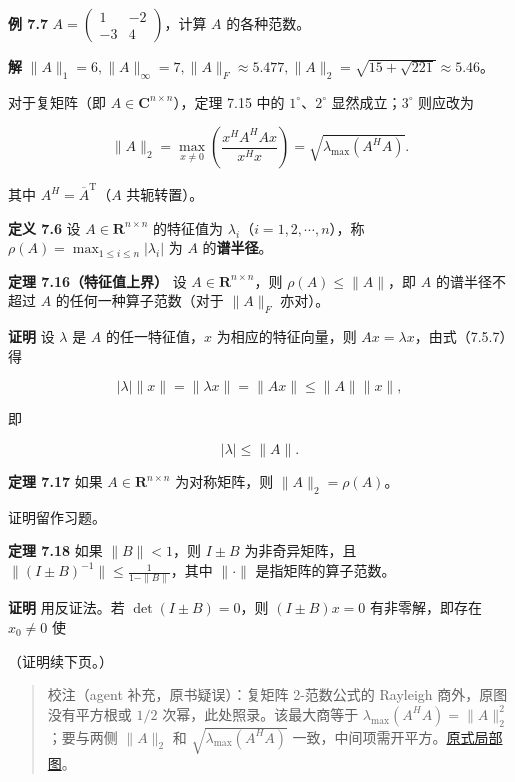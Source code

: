 \documentclass[
  10pt,
  fontset=fandol]{ctexart}
\begin{document}
\textbf{例 7.7} \(A=\begin{pmatrix}1&-2\\-3&4\end{pmatrix}\)，计算 \(A\) 的各种范数。

\textbf{解} \(\|A\|_1=6,\|A\|_\infty=7,\|A\|_F\approx5.477,\|A\|_2=\sqrt{15+\sqrt{221}}\approx5.46\)。

对于复矩阵（即 \(A\in\mathbf C^{n\times n}\)），定理 7.15 中的 \(1^\circ\)、\(2^\circ\) 显然成立；\(3^\circ\) 则应改为

\[
\|A\|_2=\max_{x\neq0}\left(\frac{x^HA^HAx}{x^Hx}\right)=\sqrt{\lambda_{\max}(A^HA)}.
\]

其中 \(A^H=\overline A^{\mathrm T}\)（\(A\) 共轭转置）。

\textbf{定义 7.6} 设 \(A\in\mathbf R^{n\times n}\) 的特征值为 \(\lambda_i\)（\(i=1,2,\cdots,n\)），称 \(\rho(A)=\max_{1\leqslant i\leqslant n}|\lambda_i|\) 为 \(A\) 的\textbf{谱半径}。

\textbf{定理 7.16（特征值上界）} 设 \(A\in\mathbf R^{n\times n}\)，则 \(\rho(A)\leqslant\|A\|\)，即 \(A\) 的谱半径不超过 \(A\) 的任何一种算子范数（对于 \(\|A\|_F\) 亦对）。

\textbf{证明} 设 \(\lambda\) 是 \(A\) 的任一特征值，\(x\) 为相应的特征向量，则 \(Ax=\lambda x\)，由式（7.5.7）得

\[
|\lambda|\|x\|=\|\lambda x\|=\|Ax\|\leqslant\|A\|\|x\|,
\]

即

\[
|\lambda|\leqslant\|A\|.
\]

\textbf{定理 7.17} 如果 \(A\in\mathbf R^{n\times n}\) 为对称矩阵，则 \(\|A\|_2=\rho(A)\)。

证明留作习题。

\textbf{定理 7.18} 如果 \(\|B\|<1\)，则 \(I\pm B\) 为非奇异矩阵，且 \(\|(I\pm B)^{-1}\|\leqslant\frac1{1-\|B\|}\)，其中 \(\|\cdot\|\) 是指矩阵的算子范数。

\textbf{证明} 用反证法。若 \(\det(I\pm B)=0\)，则 \((I\pm B)x=0\) 有非零解，即存在 \(x_0\neq0\) 使

（证明续下页。）

\begin{quote}
校注（agent 补充，原书疑误）：复矩阵 2-范数公式的 Rayleigh 商外，原图没有平方根或 \(1/2\) 次幂，此处照录。该最大商等于 \(\lambda_{\max}(A^HA)=\|A\|_2^2\)；要与两侧 \(\|A\|_2\) 和 \(\sqrt{\lambda_{\max}(A^HA)}\) 一致，中间项需开平方。\href{../assets/ch07b/204-complex-norm.png}{原式局部图}。
\end{quote}
\end{document}
